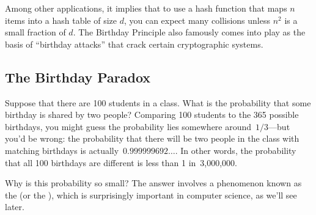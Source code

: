 Among other applications, it implies that to use a hash function that
maps $n$ items into a hash table of size $d$, you can expect many
collisions unless $n^2$ is a small fraction of $d$.  The Birthday
Principle also famously comes into play as the basis of ``birthday
attacks'' that crack certain cryptographic systems.


\begin{problems}
\practiceproblems
{}

\examproblems
{}

\classproblems
{}

\homeworkproblems
{}

\end{problems}


\iffalse %

\subsection{The Birthday Paradox}\label{birthday_principle_sec}

Suppose that there are 100 students in a class.  What is the
probability that some birthday is shared by two people?  Comparing 100
students to the 365 possible birthdays, you might guess the
probability lies somewhere around~$1/3$---but you'd be wrong: the
probability that there will be two people in the class with matching
birthdays is actually~$0.999999692\dots$.  In other words, the
probability that all 100 birthdays are different is less than 1
in~3,000,000.

Why is this probability so small?  The answer involves a phenomenon
known as the  (or the ), which is surprisingly important in computer science, as
we'll see later.

